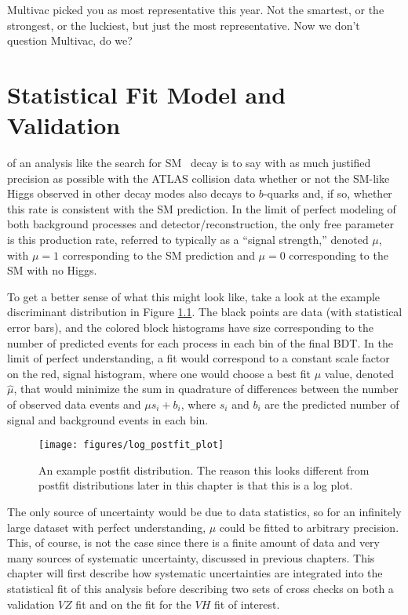 \begin{savequote}[75mm]
Multivac picked you as most representative this year.  Not the smartest, or the strongest, or the luckiest, but just the most representative.
  Now we don't question Multivac, do we?
\end{savequote}

\chapter{Statistical Fit Model and Validation}
\label{ch:fit}
 of an analysis like the search for SM \vhbb\, decay is to say with as much justified precision as possible with the ATLAS collision data whether or not the SM-like Higgs observed in other decay modes also decays to $b$-quarks and, if so, whether this rate is consistent with the SM prediction.  In the limit of perfect modeling of both background processes and detector/reconstruction, the only free parameter is this production rate, referred to typically as a ``signal strength,'' denoted $\mu$, with $\mu=1$ corresponding to the SM prediction and $\mu=0$ corresponding to the SM with no Higgs.  

To get a better sense of what this might look like, take a look at the example discriminant distribution in Figure \ref{fig:postfiteg}.  The black points are data (with statistical error bars), and the colored block histograms have size corresponding to the number of predicted events for each process in each bin of the final BDT.  In the limit of perfect understanding, a fit would correspond to a constant scale factor on the red, signal histogram, where one would choose a best fit $\mu$ value, denoted $\hat{\mu}$, that would minimize the sum in quadrature of differences between the number of observed data events and $\mu s_i+b_i$, where $s_i$ and $b_i$ are the predicted number of signal and background events in each bin.
\begin{figure}[!htbp]\captionsetup{justification=centering}
  \centering
  \texttt{[image: figures/log\_postfit\_plot]}
  \caption{An example postfit distribution.  The reason this looks different from postfit distributions later in this chapter is that this is a log plot.}
  \label{fig:postfiteg}
\end{figure}
The only source of uncertainty would be due to data statistics, so for an infinitely large dataset with perfect understanding, $\mu$ could be fitted to arbitrary precision.  This, of course, is not the case since there is a finite amount of data and very many sources of systematic uncertainty, discussed in previous chapters.  This chapter will first describe how systematic uncertainties are integrated into the statistical fit of this analysis before describing two sets of cross checks on both a validation $VZ$ fit and on the fit for the $VH$ fit of interest.

